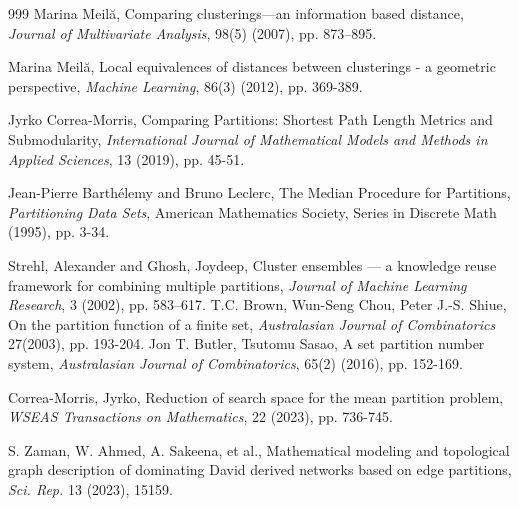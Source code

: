 \documentclass[12pt]{extarticle}
\begin{document}
\begin{thebibliography}{999}
Marina	Meil\u{a}, Comparing clusterings---an information based distance, \textit{Journal of Multivariate Analysis}, 98(5) (2007), pp. 873--895.

 Marina Meil\u{a}, Local equivalences of distances between clusterings - a	geometric perspective,
\textit{Machine Learning}, 86(3) (2012), pp. 369-389.

 Jyrko Correa-Morris, Comparing Partitions: Shortest Path Length Metrics
and Submodularity, \textit{International Journal of Mathematical Models and Methods in Applied Sciences}, 13 (2019), pp. 45-51.

 Jean-Pierre Barth\'{e}lemy and Bruno Leclerc, The Median Procedure for Partitions,
\textit{Partitioning Data Sets},
American Mathematics Society, Series in Discrete Math (1995), pp. 3-34.

 Strehl, Alexander and Ghosh, Joydeep, Cluster ensembles --- a knowledge reuse framework for combining multiple partitions, \textit{Journal of Machine Learning Research}, 3 (2002), pp. 583--617.
 T.C. Brown, Wun-Seng Chou, Peter J.-S. Shiue, On the partition function of a finite set, \textit{Australasian Journal of Combinatorics} 27(2003), pp. 193-204.
 Jon T. Butler, Tsutomu Sasao, A set partition number system, \textit{Australasian Journal of Combinatorics}, 65(2) (2016), pp. 152-169.

 Correa-Morris, Jyrko, Reduction of search space for the mean partition problem, \textit{WSEAS Transactions on Mathematics}, 22 (2023), pp. 736-745.	

 S. Zaman, W. Ahmed, A. Sakeena, et al., Mathematical modeling and topological graph description of dominating David derived networks based on edge partitions, \textit{Sci. Rep.} 13 (2023), 15159.
		
\end{thebibliography}
\end{document}
